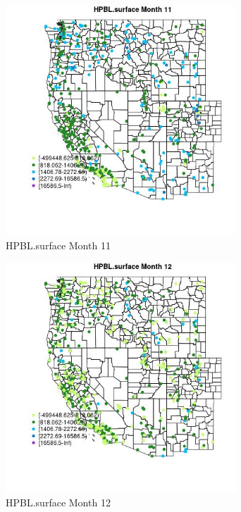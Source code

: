 \begin{figure} 
\centering  
\includegraphics[width=0.77\textwidth]{Code_Outputs/Report_ML_input_PM25_Step4_part_e_de_duplicated_aves_compiled_2019-05-14wNAs_MapObsMo11HPBLsurface.jpg} 
\caption{\label{fig:Report_ML_input_PM25_Step4_part_e_de_duplicated_aves_compiled_2019-05-14wNAsMapObsMo11HPBLsurface}HPBL.surface Month 11} 
\end{figure} 
 

\begin{figure} 
\centering  
\includegraphics[width=0.77\textwidth]{Code_Outputs/Report_ML_input_PM25_Step4_part_e_de_duplicated_aves_compiled_2019-05-14wNAs_MapObsMo12HPBLsurface.jpg} 
\caption{\label{fig:Report_ML_input_PM25_Step4_part_e_de_duplicated_aves_compiled_2019-05-14wNAsMapObsMo12HPBLsurface}HPBL.surface Month 12} 
\end{figure} 
 

